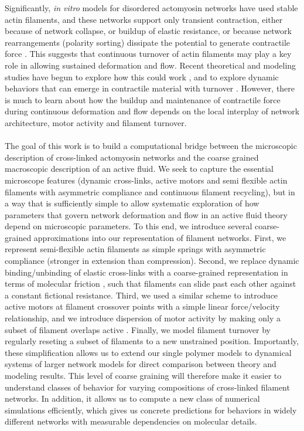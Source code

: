 \documentclass[10pt,letterpaper]{article}
\begin{document}
Significantly, {\em in vitro} models for disordered actomyosin networks have used stable actin filaments, and these networks support only transient contraction, either because of network collapse\cite{Alvarado:2013aa}, or buildup of elastic resistance\cite{Murrell15062014}, or because network rearrangements (polarity sorting) dissipate the potential to generate contractile force \cite{Ndlec:1997aa,Surrey1167}. This suggests that continuous turnover of actin filaments may play a key role in allowing sustained deformation and flow. Recent theoretical and modeling studies have begun to explore how this could work \cite{2015arXiv150706182H,Mak:2016aa,10.1371/journal.pone.0000696}, and to explore dynamic behaviors that can emerge in contractile material with turnover \cite{PhysRevLett.113.148102}. However, there is much to learn about how the buildup and maintenance of contractile force during continuous deformation and flow depends on the local interplay of network architecture, motor activity and filament turnover.



\paragraph{}  The goal of this work is to build a computational bridge between the microscopic description of cross-linked actomyosin networks and the coarse grained macroscopic description of an active fluid.  We seek to capture the essential microscope features (dynamic cross-links, active motors and semi flexible actin filaments with asymmetric compliance and continuous filament recycling), but in a way that is sufficiently simple to allow systematic exploration of how parameters that govern network deformation and flow in an active fluid theory depend on microscopic parameters. To this end, we introduce several coarse-grained approximations into our representation of filament networks. First, we represent semi-flexible actin filaments as simple springs with asymmetric compliance (stronger in extension than compression). Second, we replace  dynamic binding/unbinding of elastic cross-links with a coarse-grained representation in terms of molecular friction \cite{theo_friction,theo_frictionSam,theo_molefric}, such that filaments can slide past each other against a constant fictional resistance. Third, we used a similar scheme to introduce active motors at filament crossover points with a simple linear force/velocity relationship, and we introduce dispersion of motor activity by making only a subset of filament overlaps active \cite{theo_frictionShila}.  Finally, we model filament turnover by regularly reseting a subset of filaments to a new unstrained position. Importantly, these simplification allows us to extend our single polymer models to dynamical systems of larger network models for direct comparison between theory and modeling results. This level of coarse graining will therefore make it easier to understand classes of behavior for varying compositions of cross-linked filament networks. In addition, it allows us to compute a new class of numerical simulations efficiently, which gives us concrete predictions for behaviors in widely different networks with measurable dependencies on molecular details. 
  
\end{document}
